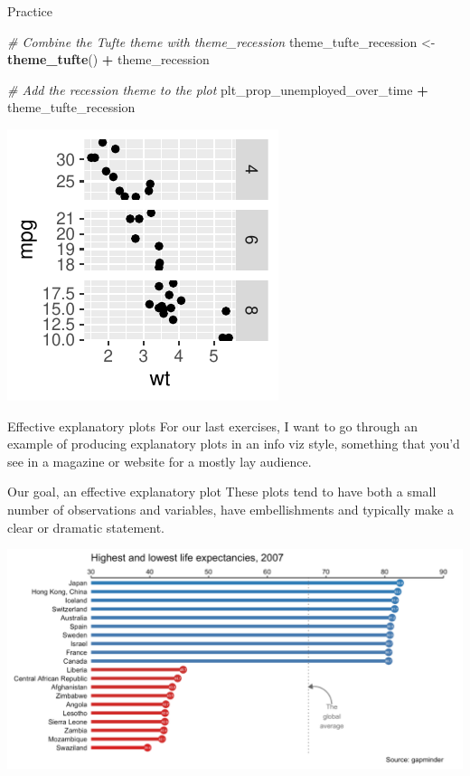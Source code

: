 \documentclass[
  ignorenonframetext,
]{beamer}
\newenvironment{Shaded}{\begin{snugshade}}{\end{snugshade}}
\newcommand{\CommentTok}[1]{\textcolor[rgb]{0.56,0.35,0.01}{\textit{#1}}}
\newcommand{\FunctionTok}[1]{\textcolor[rgb]{0.13,0.29,0.53}{\textbf{#1}}}
\newcommand{\NormalTok}[1]{#1}
\newcommand{\OtherTok}[1]{\textcolor[rgb]{0.56,0.35,0.01}{#1}}
\newcommand{\SpecialCharTok}[1]{\textcolor[rgb]{0.81,0.36,0.00}{\textbf{#1}}}
\begin{document}
\begin{frame}[fragile]{Practice}
\label{practice-9}

\begin{Shaded}
\begin{Highlighting}[]
\CommentTok{\# Combine the Tufte theme with theme\_recession}
\NormalTok{theme\_tufte\_recession }\OtherTok{\textless{}{-}} \FunctionTok{theme\_tufte}\NormalTok{() }\SpecialCharTok{+}\NormalTok{ theme\_recession}

\CommentTok{\# Add the recession theme to the plot}
\NormalTok{plt\_prop\_unemployed\_over\_time }\SpecialCharTok{+}\NormalTok{ theme\_tufte\_recession}
\end{Highlighting}
\end{Shaded}

\begin{center}\includegraphics[width=0.5\linewidth]{Figs/unnamed-chunk-90-1} \end{center}
\end{frame}

\begin{frame}{Effective explanatory plots}
\label{effective-explanatory-plots}
For our last exercises, I want to go through an example of producing
explanatory plots in an info viz style, something that you'd see in a
magazine or website for a mostly lay audience.
\end{frame}

\begin{frame}{Our goal, an effective explanatory plot}
\label{our-goal-an-effective-explanatory-plot}
These plots tend to have both a small number of observations and
variables, have embellishments and typically make a clear or dramatic
statement.

\includegraphics{../images/im216.png}
\end{frame}
\end{document}
